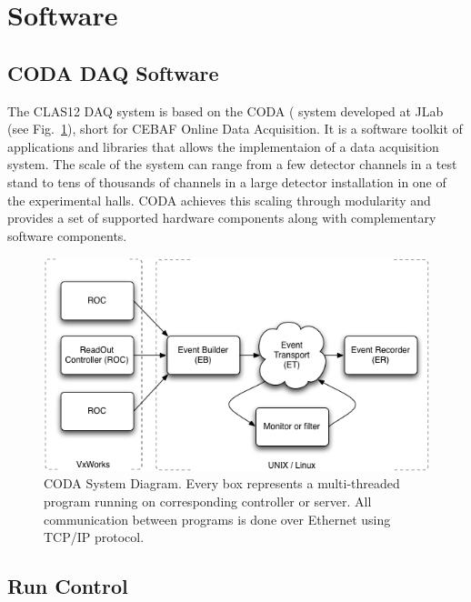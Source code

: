 \section{Software}

\subsection{CODA DAQ Software}

The CLAS12 DAQ system is based on the CODA (\cite{coda-ref} system developed at JLab (see Fig.~\ref{fig:coda_diagram}), short for CEBAF Online Data Acquisition. It is a software toolkit of applications and libraries that allows the implementaion of a data acquisition system. The scale of the system can range from a few detector channels in a test stand to tens of thousands of channels in a large detector installation in one of the experimental halls. CODA achieves this scaling through modularity and provides a set of supported hardware components along with complementary software components.

\begin{figure}[hbt]
	\centering
	\includegraphics[width=1.0\columnwidth,keepaspectratio]{img/coda_diagram.png}
	\caption{CODA System Diagram. Every box represents a multi-threaded program running on corresponding controller or server. All communication between programs is done over Ethernet using TCP/IP protocol.}
	\label{fig:coda_diagram}
\end{figure}


\subsection {Run Control}

